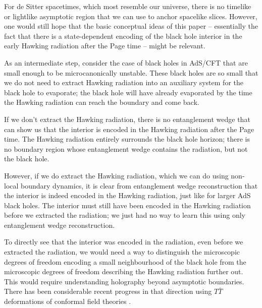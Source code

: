 \documentclass[12pt]{article}
\begin{document}
For de Sitter spacetimes, which most resemble our universe, there is no timelike or lightlike asymptotic region that we can use to anchor spacelike slices. However, one would still hope that the basic conceptual ideas of this paper -- essentially the fact that there is a state-dependent encoding of the black hole interior in the early Hawking radiation after the Page time -- might be relevant.

As an intermediate step, consider the case of black holes in AdS/CFT that are small enough to be microcanonically unstable. These black holes are so small that we do not need to extract Hawking radiation into an auxiliary system for the black hole to evaporate; the black hole will have already evaporated by the time the Hawking radiation can reach the boundary and come back.

If we don't extract the Hawking radiation, there is no entanglement wedge that can show us that the interior is encoded in the Hawking radiation after the Page time. The Hawking radiation entirely surrounds the black hole horizon; there is no boundary region whose entanglement wedge contains the radiation, but not the black hole.

However, if we do extract the Hawking radiation, which we can do using non-local boundary dynamics, it is clear from entanglement wedge reconstruction that the interior is indeed encoded in the Hawking radiation, just like for larger AdS black holes. The interior must still have been encoded in the Hawking radiation before we extracted the radiation; we just had no way to learn this using only entanglement wedge reconstruction.

To directly see that the interior was encoded in the radiation, even before we extracted the radiation, we would need a way to distinguish the microscopic degrees of freedom encoding a small neighbourhood of the black hole from the microscopic degrees of freedom describing the Hawking radiation further out. This would require understanding holography beyond asymptotic boundaries. There has been considerable recent progress in that direction using $T \bar T$ deformations of conformal field theories \cite{cavaglia2016mathrm, mcgough2018moving, kraus2018cutoff, donnelly2018entanglement, gorbenko2018ds}.
\end{document}
